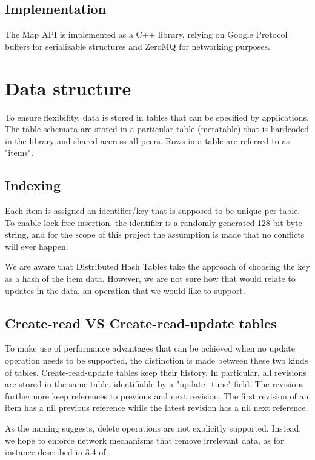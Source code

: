 \documentclass{article}
\begin{document}
\subsection{Implementation}

The Map API is implemented as a C++ library, relying on Google Protocol buffers
for serializable structures and ZeroMQ for networking purposes.

\section{Data structure}

To ensure flexibility, data is stored in tables that can be specified by
applications. The table schemata are stored in a particular table (metatable) 
that is hardcoded in the library and shared accross all peers. Rows in a table
are referred to as "items".

\subsection{Indexing}

Each item is assigned an identifier/key that is supposed to be unique per table.
To enable lock-free insertion, the identifier is a randomly generated 128 bit 
byte string, and for the scope of this project the assumption is made that no
conflicts will ever happen.

We are aware that Distributed Hash Tables take the approach of choosing the key
as a hash of the item data. However, we are not sure how that would relate to
updates in the data, an operation that we would like to support.

\subsection{Create-read VS Create-read-update tables}

To make use of performance advantages that can be achieved when no update
operation needs to be supported, the distinction is made between these two
kinds of tables. Create-read-update tables keep their history. In particular,
all revisions are stored in the same table, identifiable by a "update\_time" 
field. The revisions furthermore keep references to previous and next revision.
The first revision of an item has a nil previous reference while the latest
revision has a nil next reference. 

As the naming suggests, delete operations are not explicitly supported. Instead,
we hope to enforce network mechanisms that remove irrelevant data, as for
instance described in 3.4 of \cite{freenet}.
\end{document}
